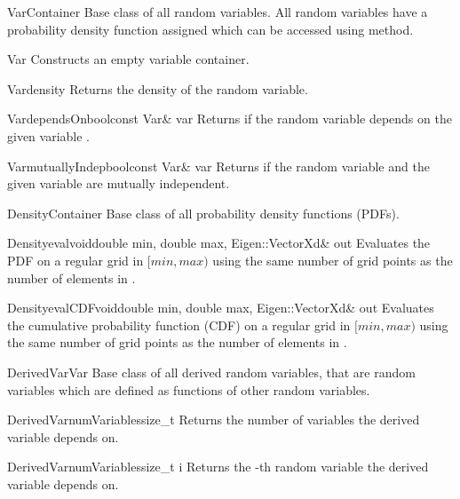 \begin{defclassex}{Var}{Container}
Base class of all random variables. All random variables have a probability density function assigned which can be accessed
using  method.

\begin{classsyn}{Var}{} 
Constructs an empty variable container.
\end{classsyn}

\begin{defmeth}{Var}{density}{}{}
Returns the density of the random variable.
\end{defmeth}

\begin{defmeth}{Var}{dependsOn}{bool}{const Var\& var}
Returns  if the random variable depends on the given variable .
\end{defmeth}

\begin{defmeth}{Var}{mutuallyIndep}{bool}{const Var\& var}
Returns  if the random variable and the given variable are mutually independent.
\end{defmeth}
\end{defclassex}

\begin{defclassex}{Density}{Container}
Base class of all probability density functions (PDFs).

\begin{defmeth}{Density}{eval}{void}{double min, double max, Eigen::VectorXd\& out}
Evaluates the PDF on a regular grid in $[min, max)$ using the same number of grid points as the number
of elements in .
\end{defmeth}
 
\begin{defmeth}{Density}{evalCDF}{void}{double min, double max, Eigen::VectorXd\& out}
Evaluates the cumulative probability function (CDF) on a regular grid in $[min, max)$ using the same number
of grid points as the number of elements in .
\end{defmeth}
\end{defclassex}

\begin{defclassex}{DerivedVar}{Var}
Base class of all derived random variables, that are random variables which are defined as functions of other random 
variables.

\begin{defmeth}{DerivedVar}{numVariables}{size\_t}{}
Returns the number of variables the derived variable depends on.
\end{defmeth}

\begin{defmeth}{DerivedVar}{numVariables}{}{size\_t i}
Returns the -th random variable the derived variable depends on.
\end{defmeth}
\end{defclassex}

